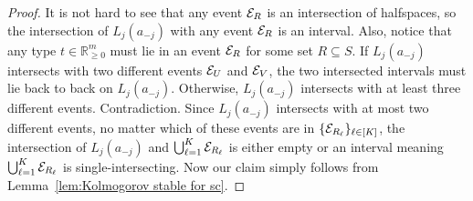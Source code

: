 \begin{proof}
It is not hard to see that any event ${\mathcal{E}}_R$ is an intersection of halfspaces, so the intersection of $L_j(a_{-j})$ with any event ${\mathcal{E}}_R$ is an interval. {Also, notice that any type $t\in\mathbb{R}_{\geq 0}^{m}$ must lie in an event ${\mathcal{E}}_R$ for some set $R\subseteq S$.} If $L_j(a_{-j})$ intersects with two different events ${\mathcal{E}}_U$ and ${\mathcal{E}}_V$, the two intersected intervals must lie back to back on $L_j(a_{-j})$. Otherwise, $L_j(a_{-j})$ intersects with at least three different events. Contradiction. Since $L_j(a_{-j})$ intersects with at most two different events, no matter which of these events are in $\{{\mathcal{E}}_{R_\ell}\}_{\ell\in[K]}$, the intersection of $L_j(a_{-j})$ and $\bigcup_{\ell=1}^K {\mathcal{E}}_{R_\ell}$ is either empty or an interval meaning $\bigcup_{\ell=1}^K {\mathcal{E}}_{R_\ell}$ is single-intersecting. Now our claim simply follows from Lemma~\ref{lem:Kolmogorov stable for sc}.
\end{proof}

